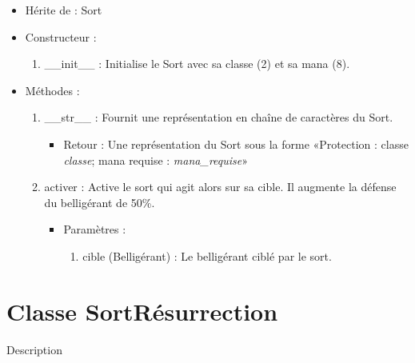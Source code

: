 \documentclass[12pt,pdftex,oneside]{article}
\begin{document}
  \begin{itemize}
  \item Hérite de : Sort


  \item Constructeur : 

  \begin{enumerate}
  \item \_\_init\_\_ : Initialise le Sort avec sa classe (2) et sa mana (8).

  \end{enumerate}

  \item Méthodes : 

    \begin{enumerate}
    \item \_\_str\_\_ : Fournit une représentation en chaîne de caractères du Sort.
      \begin{itemize}
      \item Retour : Une représentation du Sort sous la forme «Protection : classe \emph{classe}; mana requise : \emph{mana\_requise}»
      \end{itemize}
    \item activer : Active le sort qui agit alors sur sa cible. Il augmente la
      défense du belligérant de 50\%.
      \begin{itemize}
      \item Paramètres : 
        \begin{enumerate}
        \item cible (Belligérant) : Le belligérant ciblé par le sort.
        \end{enumerate}
      \end{itemize}

    \end{enumerate}
  \end{itemize}

  \section {Classe SortRésurrection}

  Description
\end{document}
